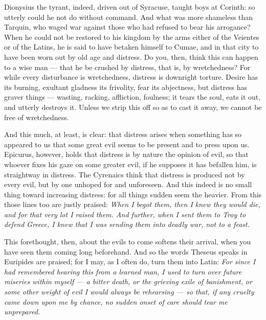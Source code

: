  Dionysius the tyrant, indeed, driven out of Syracuse, taught boys at Corinth: so utterly could he not do without command. And what was more shameless than Tarquin, who waged war against those who had refused to bear his arrogance? When he could not be restored to his kingdom by the arms either of the Veientes or of the Latins, he is said to have betaken himself to Cumae, and in that city to have been worn out by old age and distress. Do you, then, think this can happen to a wise man — that he be crushed by distress, that is, by wretchedness? For while every disturbance is wretchedness, distress is downright torture. Desire has its burning, exultant gladness its frivolity, fear its abjectness, but distress has graver things — wasting, racking, affliction, foulness; it tears the soul, eats it out, and utterly destroys it. Unless we strip this off so as to cast it away, we cannot be free of wretchedness.

 And this much, at least, is clear: that distress arises when something has so appeared to us that some great evil seems to be present and to press upon us. Epicurus, however, holds that distress is by nature the opinion of evil, so that whoever fixes his gaze on some greater evil, if he supposes it has befallen him, is straightway in distress. The Cyrenaics think that distress is produced not by every evil, but by one unhoped for and unforeseen. And this indeed is no small thing toward increasing distress: for all things sudden seem the heavier. From this those lines too are justly praised: \textit{When I begot them, then I knew they would die, and for that very lot I raised them. And further, when I sent them to Troy to defend Greece, I knew that I was sending them into deadly war, not to a feast.}

 This forethought, then, about the evils to come softens their arrival, when you have seen them coming long beforehand. And so the words Theseus speaks in Euripides are praised; for I may, as I often do, turn them into Latin: \textit{For since I had remembered hearing this from a learned man, I used to turn over future miseries within myself — a bitter death, or the grieving exile of banishment, or some other weight of evil I would always be rehearsing — so that, if any cruelty came down upon me by chance, no sudden onset of care should tear me unprepared.}

